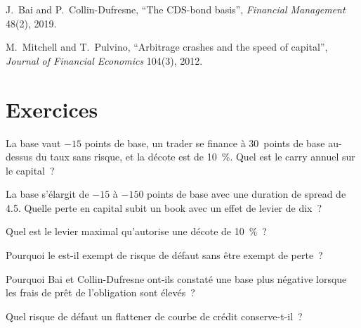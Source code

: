 \begin{omsources}
\item J.~Bai and P.~Collin-Dufresne, ``The CDS-bond basis'', \emph{Financial Management} 48(2), 2019.
\item M.~Mitchell and T.~Pulvino, ``Arbitrage crashes and the speed of capital'', \emph{Journal of Financial Economics} 104(3), 2012.
\end{omsources}

\section{Exercices}

\begin{exercise}[$\star$]\label{exo:s2:credit-relative-value:1}
La base vaut $-15$ points de base, un trader se finance à 30~points de base au-dessus du taux sans risque, et la décote est de 10~\%. Quel est le carry annuel sur le capital~?
\end{exercise}

\begin{exercise}[$\star$]\label{exo:s2:credit-relative-value:2}
La base s'élargit de $-15$ à $-150$ points de base avec une duration de spread de 4.5. Quelle perte en capital subit un book avec un effet de levier de dix~?
\end{exercise}

\begin{exercise}[$\star$]\label{exo:s2:credit-relative-value:3}
Quel est le levier maximal qu'autorise une décote de 10~\%~?
\end{exercise}

\begin{exercise}[$\star\star$]\label{exo:s2:credit-relative-value:4}
Pourquoi le  est-il exempt de risque de défaut sans être exempt de perte~?
\end{exercise}

\begin{exercise}[$\star\star$]\label{exo:s2:credit-relative-value:5}
Pourquoi Bai et Collin-Dufresne ont-ils constaté une base plus négative lorsque les frais de prêt de l'obligation sont élevés~?
\end{exercise}

\begin{exercise}[$\star\star$]\label{exo:s2:credit-relative-value:6}
Quel risque de défaut un flattener de courbe de crédit conserve-t-il~?
\end{exercise}

